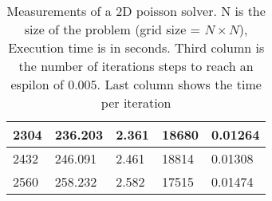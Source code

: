\documentclass[11pt,a4paper]{article}
\begin{document}
\begin{table}[!ht]
\begin{tabular}{ | l | l | l | l | l |}
\hline 
 2304 & 236.203 & 2.361 & 18680 & 0.01264 \\ 
\hline 
 2432 & 246.091 & 2.461 & 18814 & 0.01308 \\ 
\hline 
 2560 & 258.232 & 2.582 & 17515 & 0.01474 \\ 
\hline 
\end{tabular}
\caption{Measurements of a 2D poisson solver. N is the size of the problem (grid size = $N \times N$), Execution time is in seconds. Third column is the number of iterations steps to reach an espilon of $0.005$. Last column shows the time per iteration}
\label{tab1}
\end{table}


\end{document}
